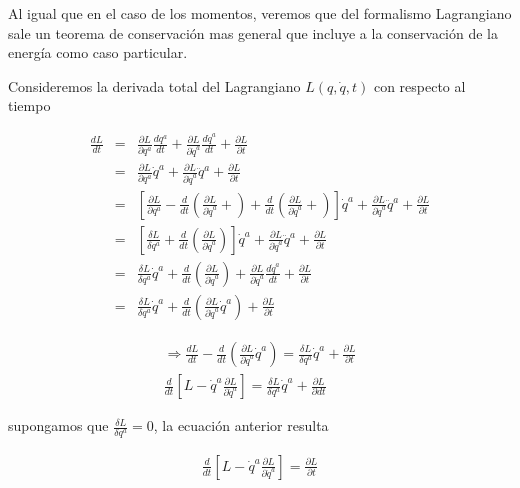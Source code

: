 \documentclass[12pt]{report}
\begin{document}
Al igual que en el caso de los momentos, veremos que del formalismo Lagrangiano sale un  teorema de conservación mas general que incluye a la conservación de la energía como caso particular.   
 

Consideremos la derivada total  del Lagrangiano $L(q,\dot{q},t)$  con respecto al tiempo

\begin{eqnarray}
\frac{dL}{dt} &=& \frac{\partial L}{\partial q^a} \frac{dq^a}{dt} + \frac{\partial L}{\partial \dot{q}^a}\frac{d \dot{q}^a}{dt} + \frac{\partial L}{\partial t} \\
&=& \frac{\partial L}{\partial q^a} \dot{q}^a + \frac{\partial L}{\partial \dot{q}^a} \ddot{q}^a + \frac{\partial L}{\partial t} \\
&=& \left[ \frac{\partial L}{\partial q^a}-\frac{d}{dt} \left( \frac{\partial L}{\partial \dot{q}^a} + \right) + \frac{d}{dt} \left( \frac{\partial L}{\partial \dot{q}^a} + \right) \right] \dot{q}^a + \frac{\partial L}{\partial \dot{q}^a} \ddot{q}^a + \frac{\partial L}{\partial t} \\
&=& \left[ \frac{\delta L}{\delta q^a} + \frac{d}{dt} \left( \frac{\partial L}{\partial \dot{q}^a} \right) \right] \dot{q}^a + \frac{\partial L}{\partial \dot{q}^a} \ddot{q}^a + \frac{\partial L}{\partial t} \\
&=&\frac{\delta L}{\delta q^a} \dot{q}^a + \frac{d}{dt} \left( \frac{\partial L}{\partial \dot{q}^a} \right) + \frac{\partial L}{\partial \dot{q}^a} \frac{d \dot{q}^a}{dt} + \frac{\partial L}{\partial t} \\
&=& \frac{\delta L}{\delta q^a} \dot{q}^a + \frac{d}{dt} \left( \frac{\partial L}{\partial \dot{q}^a} \dot{q}^a \right) + \frac{\partial L}{\partial t} 
\end{eqnarray}

\begin{eqnarray}
\Rightarrow \frac{dL}{dt} - \frac{d}{dt} \left( \frac{\partial L}{\partial \dot{q}^a} \dot{q}^a \right) = \frac{\delta L}{\delta q^a} \dot{q}^a + \frac{\partial L}{\partial t} \\
\frac{d}{dt} \left[ L - \dot{q}^a \frac{\partial L}{\partial \dot{q}^a} \right]= \frac{\delta L}{\delta q^a} \dot{q}^a + \frac{\partial L}{\partial dt}
\end{eqnarray}


supongamos que $\displaystyle\frac{\delta L}{\delta q^a}=0$, la ecuación anterior resulta

\begin{eqnarray}
\frac{d}{dt} \left[ L - \dot{q}^a \frac{\partial L}{\partial \dot{q}^a} \right]= \frac{\partial L}{\partial t} 
\end{eqnarray}
\end{document}

